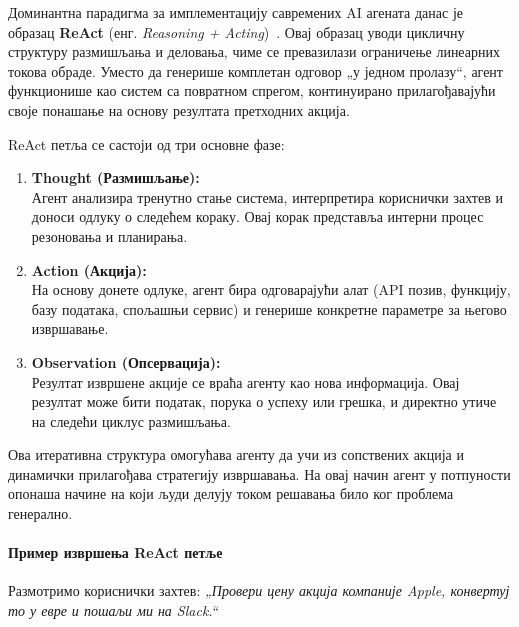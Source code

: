 Доминантна парадигма за имплементацију савремених AI агената данас је образац
\textbf{ReAct} (енг. \textit{Reasoning + Acting})~\cite{yao2022react,wang2024agents}.
Овај образац уводи цикличну структуру размишљања и деловања,
чиме се превазилази ограничење линеарних токова обраде.
Уместо да генерише комплетан одговор „у једном пролазу“,
агент функционише као систем са повратном спрегом,
континуирано прилагођавајући своје понашање на основу резултата претходних акција.

ReAct петља се састоји од три основне фазе:

\begin{enumerate}
    \item \textbf{Thought (Размишљање):} \\
    Агент анализира тренутно стање система, интерпретира кориснички захтев
    и доноси одлуку о следећем кораку.
    Овај корак представља интерни процес резоновања и планирања.

    \item \textbf{Action (Акција):} \\
    На основу донете одлуке, агент бира одговарајући алат
    (API позив, функцију, базу података, спољашњи сервис)
    и генерише конкретне параметре за његово извршавање.

    \item \textbf{Observation (Опсервација):} \\
    Резултат извршене акције се враћа агенту као нова информација.
    Овај резултат може бити податак, порука о успеху или грешка,
    и директно утиче на следећи циклус размишљања.
\end{enumerate}

Ова итеративна структура омогућава агенту да учи из сопствених акција
и динамички прилагођава стратегију извршавања. На овај начин агент у потпуности опонаша начине на који људи делују током решавања било ког проблема генерално.

\paragraph*{Пример извршења ReAct петље}

Размотримо кориснички захтев:
\textit{„Провери цену акција компаније Apple, конвертуј то у евре и пошаљи ми на Slack.“}

